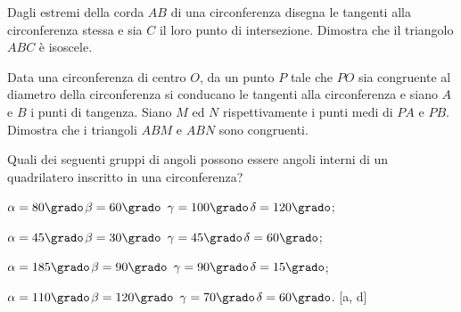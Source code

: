 \begin{multicols}{2}
\begin{esercizio}
\label{ese:5.37}
Dagli estremi della corda \(AB\) di una circonferenza disegna le 
tangenti alla circonferenza stessa e sia \(C\) il loro punto di 
intersezione. Dimostra che il triangolo \(ABC\) è isoscele.
\end{esercizio}


\begin{esercizio}
\label{ese:5.39}
Data una circonferenza di centro \(O\), da un punto \(P\) tale che \(PO\) 
sia congruente al diametro della circonferenza si conducano le 
tangenti alla circonferenza e siano \(A\) e \(B\) i punti di tangenza. 
Siano \(M\) ed \(N\) rispettivamente i punti medi di \(PA\) e \(PB\). 
Dimostra che i triangoli \(ABM\) e \(ABN\) sono congruenti.
\end{esercizio}


\end{multicols}



\begin{esercizio}
\label{ese:5.41}
Quali dei seguenti gruppi di angoli possono essere angoli interni di 
un quadrilatero inscritto in una circonferenza?
\begin{enumeratea}
\item \(\alpha=80\grado\)\quad\(\beta=60\grado\)\quad 
\(\gamma=100\grado\)\quad \(\delta=120\grado\);
\item \(\alpha=45\grado\)\quad \(\beta=30\grado\)\quad 
\(\gamma=45\grado\)\quad \(\delta=60\grado\);
\item \(\alpha=185\grado\)\quad \(\beta=90\grado\)\quad 
\(\gamma=90\grado\)\quad \(\delta=15\grado\);
\item \(\alpha=110\grado\)\quad \(\beta=120\grado\)\quad 
\(\gamma=70\grado\)\quad \(\delta=60\grado\).
\hfill [a, d]
\end{enumeratea}
\end{esercizio}

